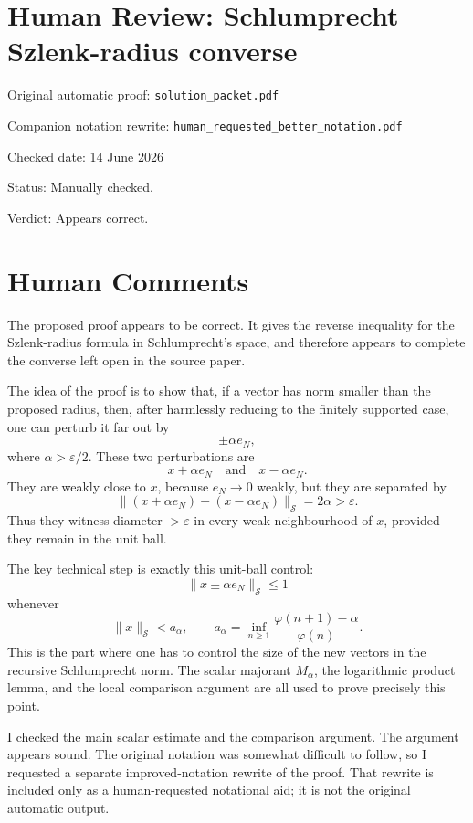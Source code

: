 \documentclass[11pt]{article}
\newcommand{\Ssp}{\mathcal S}
\newcommand{\ph}{\varphi}
\begin{document}
\section*{Human Review: Schlumprecht Szlenk-radius converse}

\noindent Original automatic proof: \texttt{solution\_packet.pdf}

\noindent Companion notation rewrite: \texttt{human\_requested\_better\_notation.pdf}

\noindent Checked date: 14 June 2026

\noindent Status: Manually checked.

\noindent Verdict: Appears correct.

\section*{Human Comments}

The proposed proof appears to be correct.  It gives the reverse inequality
for the Szlenk-radius formula in Schlumprecht's space, and therefore appears
to complete the converse left open in the source paper.

The idea of the proof is to show that, if a vector has norm smaller than the
proposed radius, then, after harmlessly reducing to the finitely supported
case, one can perturb it far out by
\[
  \pm \alpha e_N,
\]
where \(\alpha>\varepsilon/2\).  These two perturbations are
\[
  x+\alpha e_N
  \quad\text{and}\quad
  x-\alpha e_N.
\]
They are weakly close to \(x\), because \(e_N\to 0\) weakly, but they are
separated by
\[
  \|(x+\alpha e_N)-(x-\alpha e_N)\|_{\Ssp}
  =
  2\alpha
  >
  \varepsilon.
\]
Thus they witness diameter \(>\varepsilon\) in every weak neighbourhood of
\(x\), provided they remain in the unit ball.

The key technical step is exactly this unit-ball control:
\[
  \|x\pm \alpha e_N\|_{\Ssp}\le 1
\]
whenever
\[
  \|x\|_{\Ssp}<a_\alpha,
  \qquad
  a_\alpha=
  \inf_{n\ge 1}\frac{\ph(n+1)-\alpha}{\ph(n)}.
\]
This is the part where one has to control the size of the new vectors in the
recursive Schlumprecht norm.  The scalar majorant \(M_\alpha\), the
logarithmic product lemma, and the local comparison argument are all used to
prove precisely this point.

I checked the main scalar estimate and the comparison argument.  The
argument appears sound.  The original notation was somewhat difficult to
follow, so I requested a separate improved-notation rewrite of the proof.
That rewrite is included only as a human-requested notational aid; it is not
the original automatic output.
\end{document}
